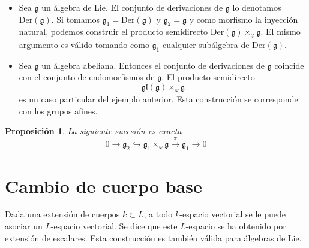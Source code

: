 \documentclass[a4paper,draft,12pt]{article}
\newtheorem{propo}[teo]{Proposición}%
\newcommand{\lto}{\longrightarrow}%
\begin{document}

\begin{itemize}

\item Sea $\mathfrak{g}$ un álgebra de Lie.  El conjunto de derivaciones de $\mathfrak{g}$ lo denotamos $\mathrm{Der}(\mathfrak{g})$. Si tomamos $\mathfrak{g}_1= \mathrm{Der}(\mathfrak{g})$ y $\mathfrak{g}_2=\mathfrak{g}$ y como morfismo la inyección natural, podemos construir el producto semidirecto $\mathrm{Der}(\mathfrak{g}) \times_\varphi \mathfrak{g}$.  El mismo argumento es válido tomando como $\mathfrak{g}_1$ cualquier subálgebra de $\mathrm{Der}(\mathfrak{g})$.

\item Sea $\mathfrak{g}$ un álgebra abeliana.  Entonces el conjunto de derivaciones de $\mathfrak{g}$ coincide con el conjunto de endomorfismos de $\mathfrak{g}$.  El producto semidirecto
$$
\mathfrak{gl}(\mathfrak{g}) \times_\varphi \mathfrak{g}
$$
es un caso particular del ejemplo anterior.  Esta construcción se corresponde con los grupos afines.

\end{itemize}

\begin{propo}

La siguiente sucesión es exacta
$$
0 \lto \mathfrak{g}_2 \hookrightarrow \mathfrak{g}_1 \times_\varphi \mathfrak{g} \stackrel{\pi}{\lto} \mathfrak{g}_1 \lto 0
$$

\end{propo}

\newpage

\section{Cambio de cuerpo base}

Dada una extensión de cuerpos $k \subset L$, a todo $k$-espacio vectorial se le puede asociar un $L$-espacio vectorial.  Se dice que este $L$-espacio se ha obtenido por extensión de escalares.  Esta construcción es también válida para álgebras de Lie.
\end{document}
